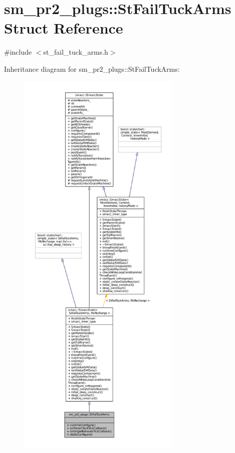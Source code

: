 \hypertarget{structsm__pr2__plugs_1_1StFailTuckArms}{}\section{sm\+\_\+pr2\+\_\+plugs\+:\+:St\+Fail\+Tuck\+Arms Struct Reference}
\label{structsm__pr2__plugs_1_1StFailTuckArms}


{\ttfamily \#include $<$st\+\_\+fail\+\_\+tuck\+\_\+arms.\+h$>$}



Inheritance diagram for sm\+\_\+pr2\+\_\+plugs\+:\+:St\+Fail\+Tuck\+Arms\+:
\nopagebreak
\begin{figure}[H]
\begin{center}
\leavevmode
\includegraphics[height=550pt]{structsm__pr2__plugs_1_1StFailTuckArms__inherit__graph}
\end{center}
\end{figure}


